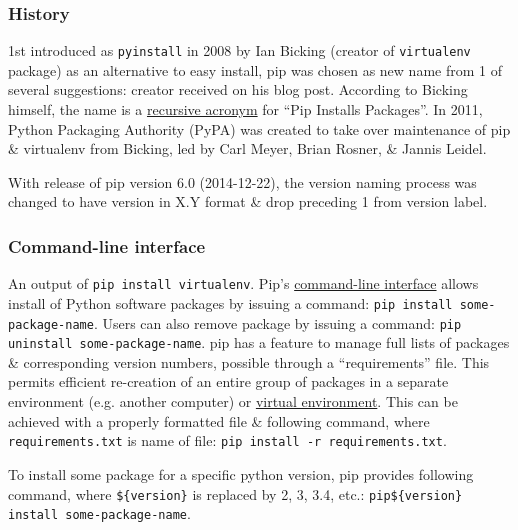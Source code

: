 \documentclass{article}
\begin{document}
\subsubsection{History}
1st introduced as {\tt pyinstall} in 2008 by {\sc Ian Bicking} (creator of {\tt virtualenv} package) as an alternative to easy install, pip was chosen as new name from 1 of several suggestions: creator received on his blog post. According to {\sc Bicking} himself, the name is a \href{https://en.wikipedia.org/wiki/Recursive_acronym}{recursive acronym} for ``Pip Installs Packages''. In 2011, Python Packaging Authority (PyPA) was created to take over maintenance of pip \& virtualenv from {\sc Bicking}, led by {\sc Carl Meyer, Brian Rosner, \& Jannis Leidel}.

With release of pip version 6.0 (2014-12-22), the version naming process was changed to have version in X.Y format \& drop preceding 1 from version label.

\subsubsection{Command-line interface}
{\sf An output of {\tt pip install virtualenv}}. Pip's \href{https://en.wikipedia.org/wiki/Command-line_interface}{command-line interface} allows install of Python software packages by issuing a command: {\tt pip install some-package-name}. Users can also remove package by issuing a command: {\tt pip uninstall some-package-name}. pip has a feature to manage full lists of packages \& corresponding version numbers, possible through a ``requirements'' file. This permits efficient re-creation of an entire group of packages in a separate environment (e.g. another computer) or \href{https://en.wikipedia.org/wiki/Virtualization}{virtual environment}. This can be achieved with a properly formatted file \& following command, where {\tt requirements.txt} is name of file: {\tt pip install -r requirements.txt}.

To install some package for a specific python version, pip provides following command, where \verb|${version}| is replaced by 2, 3, 3.4, etc.: \verb|pip${version} install some-package-name|.
\end{document}
